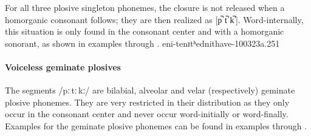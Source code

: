 For all three plosive singleton phonemes, the closure is not released when a homorganic consonant %
follows; they are then realized as [p̚ t̚ k̚\,]. Word-internally, this situation is only found in the consonant center and with a homorganic sonorant, as shown in examples  through . 
{eni-t}{enɪtʰ}{ednit}{have-}{100323a}{.251}


\paragraph{Voiceless geminate plosives}
The segments /pː\,tː\,kː/ are bilabial, alveolar and velar (respectively) geminate plosive phonemes. They are very restricted in their distribution as they only occur in the consonant center %
and never occur word-initially or word-finally. %
Examples for the geminate plosive phonemes can be found in examples  through .

